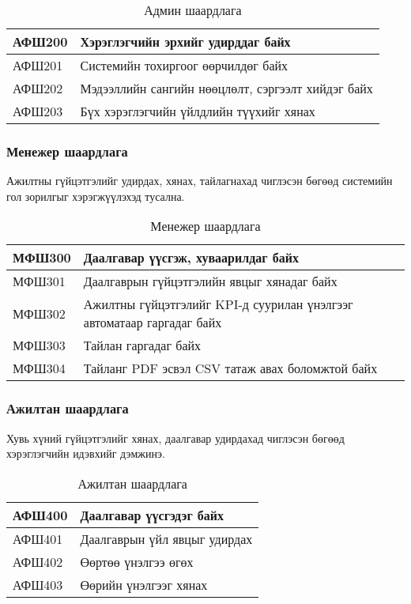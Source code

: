 \begin{table}[H]
    \centering
    \label{my-label}
    \begin{tabular}{|p{1.7cm}|p{12cm}|}
        \hline
          АФШ200 & Хэрэглэгчийн эрхийг удирддаг байх\\ \hline
          АФШ201 & Системийн тохиргоог өөрчилдөг байх\\ \hline
          АФШ202 & Мэдээллийн сангийн нөөцлөлт, сэргээлт хийдэг байх\\\hline
          АФШ203 & Бүх хэрэглэгчийн үйлдлийн түүхийг хянах\\ \hline
    \end{tabular}
    \caption{Админ шаардлага}
\end{table}

\subsubsection{Менежер шаардлага}
Ажилтны гүйцэтгэлийг удирдах, хянах, тайлагнахад чиглэсэн бөгөөд системийн гол зорилгыг хэрэгжүүлэхэд тусална.

\begin{table}[H]
    \centering
    \label{my-label}
    \begin{tabular}{|p{1.7cm}|p{12cm}|}
        \hline
          МФШ300 & Даалгавар үүсгэж, хуваарилдаг байх\\ \hline
          МФШ301 & Даалгаврын гүйцэтгэлийн явцыг хянадаг байх\\ \hline
          МФШ302 & Ажилтны гүйцэтгэлийг KPI-д суурилан үнэлгээг автоматаар гаргадаг байх\\\hline
          МФШ303 & Тайлан гаргадаг байх\\ \hline
          МФШ304 & Тайланг PDF эсвэл CSV татаж авах боломжтой байх\\ \hline
    \end{tabular}
    \caption{Менежер шаардлага}
\end{table}

\subsubsection{Ажилтан шаардлага}
Хувь хүний гүйцэтгэлийг хянах, даалгавар удирдахад чиглэсэн бөгөөд хэрэглэгчийн идэвхийг дэмжинэ.

\begin{table}[H]
    \centering
    \label{my-label}
    \begin{tabular}{|p{1.7cm}|p{12cm}|}
        \hline
        АФШ400 & Даалгавар үүсгэдэг байх\\ \hline
        АФШ401 & Даалгаврын үйл явцыг удирдах\\ \hline
        АФШ402 & Өөртөө үнэлгээ өгөх\\\hline
        АФШ403 & Өөрийн үнэлгээг хянах\\ \hline
    \end{tabular}
    \caption{Ажилтан шаардлага}
\end{table}

